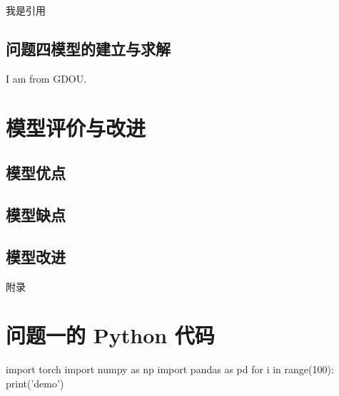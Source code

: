 \documentclass{ManuscriptStyle}
\begin{document}
	我是引用\cite{wang2020-p1}

	\subsection{问题四模型的建立与求解}

	I am from GDOU.

	\section{模型评价与改进}

	\subsection{模型优点}

	\subsection{模型缺点}

	\subsection{模型改进}

	

	\newpage
	\appendix
	\begin{center}
		\heiti{} 附\hspace{1pc}录
	\end{center}
	
\section{问题一的 Python 代码}
  \begin{python}
      import torch
      import numpy as np
      import pandas as pd
      for i in range(100):
          print('demo')
  \end{python}
\end{document}
